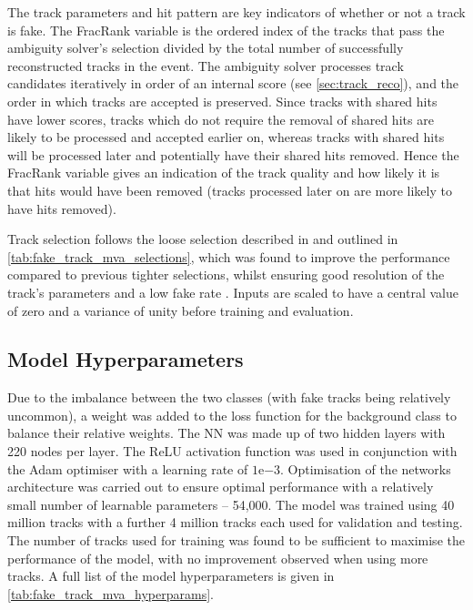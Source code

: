The track parameters and hit pattern are key indicators of whether or not a track is fake.
The FracRank variable is the ordered index of the tracks that pass the ambiguity solver's selection divided by the total number of successfully reconstructed tracks in the event.
The ambiguity solver processes track candidates iteratively in order of an internal score (see \cref{sec:track_reco}), and the order in which tracks are accepted is preserved.
Since tracks with shared hits have lower scores, tracks which do not require the removal of shared hits are likely to be processed and accepted earlier on, whereas tracks with shared hits will be processed later and potentially have their shared hits removed.
Hence the FracRank variable gives an indication of the track quality and how likely it is that hits would have been removed (tracks processed later on are more likely to have hits removed).

Track selection follows the loose selection described in  and outlined in \cref{tab:fake_track_mva_selections}, which was found to improve the performance compared to previous tighter selections, whilst ensuring good resolution of the track's parameters and a low fake rate \cite{PERF-2015-08}.
Inputs are scaled to have a central value of zero and a variance of unity before training and evaluation.


\subsection{Model Hyperparameters}\label{sec:hyperparameters}

Due to the imbalance between the two classes (with fake tracks being relatively uncommon), a weight was added to the loss function for the background class to balance their relative weights.
The NN was made up of two hidden layers with 220 nodes per layer.
The ReLU activation function was used in conjunction with the Adam optimiser with a learning rate of $1\text{e}{-3}$.
Optimisation of the networks architecture was carried out to ensure optimal performance with a relatively small number of learnable parameters -- 54,000.
The model was trained using \num{40} million tracks with a further \num{4} million tracks each used for validation and testing.
The number of tracks used for training was found to be sufficient to maximise the performance of the model, with no improvement observed when using more tracks.
A full list of the model hyperparameters is given in \cref{tab:fake_track_mva_hyperparams}.

